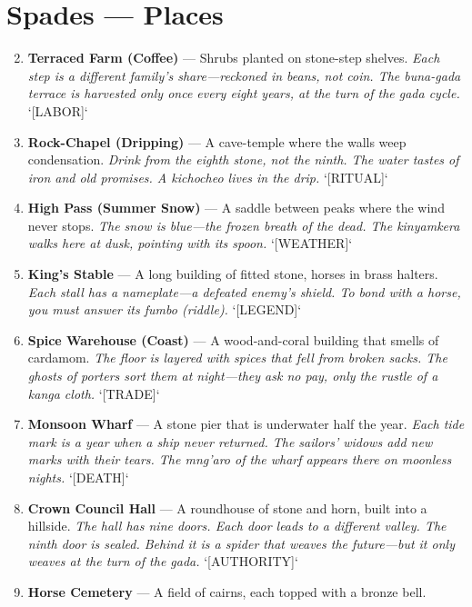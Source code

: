 \section*{Spades --- Places}
\label{sec:taharka-places}
\begin{enumerate}
\setcounter{enumi}{1}
\item \textbf{Terraced Farm (Coffee)} --- Shrubs planted on stone-step shelves.
  \hfill \textit{Each step is a different family's share---reckoned in beans, not coin. The \textit{buna-gada} terrace is harvested only once every eight years, at the turn of the \textit{gada} cycle.} `[LABOR]`
\item \textbf{Rock-Chapel (Dripping)} --- A cave-temple where the walls weep condensation.
  \hfill \textit{Drink from the eighth stone, not the ninth. The water tastes of iron and old promises. A \textit{kichocheo} lives in the drip.} `[RITUAL]`
\item \textbf{High Pass (Summer Snow)} --- A saddle between peaks where the wind never stops.
  \hfill \textit{The snow is blue---the frozen breath of the dead. The \textit{kinyamkera} walks here at dusk, pointing with its spoon.} `[WEATHER]`
\item \textbf{King's Stable} --- A long building of fitted stone, horses in brass halters.
  \hfill \textit{Each stall has a nameplate---a defeated enemy's shield. To bond with a horse, you must answer its \textit{fumbo} (riddle).} `[LEGEND]`
\item \textbf{Spice Warehouse (Coast)} --- A wood-and-coral building that smells of cardamom.
  \hfill \textit{The floor is layered with spices that fell from broken sacks. The ghosts of porters sort them at night---they ask no pay, only the rustle of a \textit{kanga} cloth.} `[TRADE]`
\item \textbf{Monsoon Wharf} --- A stone pier that is underwater half the year.
  \hfill \textit{Each tide mark is a year when a ship never returned. The sailors' widows add new marks with their tears. The \textit{mng'aro} of the wharf appears there on moonless nights.} `[DEATH]`
\item \textbf{Crown Council Hall} --- A roundhouse of stone and horn, built into a hillside.
  \hfill \textit{The hall has nine doors. Each door leads to a different valley. The ninth door is sealed. Behind it is a spider that weaves the future---but it only weaves at the turn of the \textit{gada}.} `[AUTHORITY]`
\item \textbf{Horse Cemetery} --- A field of cairns, each topped with a bronze bell.

\end{enumerate}
